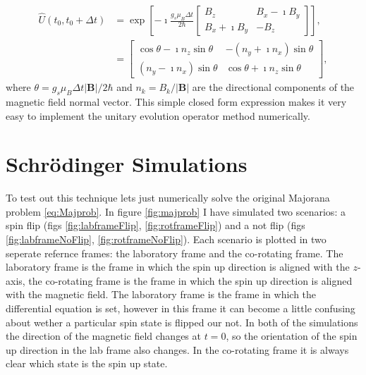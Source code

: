 \begin{align}
    \widehat{U}(t_0,t_0+\Delta t) &= \exp\left[  -\imath\frac{g_s\mu_B\Delta t}{2 \hbar} \begin{bmatrix} B_z & B_x - \imath B_y \\
                                                      B_x + \imath B_y & -B_z \end{bmatrix} \right],\\
                &= \begin{bmatrix} \cos\theta - \imath n_z \sin\theta & -\left(n_y+\imath n_x\right)\sin\theta \\
                                   \left(n_y-\imath n_x\right)\sin\theta & \cos\theta + \imath n_z \sin\theta\end{bmatrix}, 
\end{align}
where $\theta = g_s \mu_B \Delta t \vert \mathbf{B} \vert / 2\hbar$ and $n_k = B_k / \vert \mathbf{B} \vert$ are the directional components of the magnetic field normal vector.
This simple closed form expression makes it very easy to implement the unitary evolution operator method numerically.


\section{Schr\"odinger Simulations}

To test out this technique lets just numerically solve the original Majorana problem \eqref{eq:Majprob}.
In figure \ref{fig:majprob} I have simulated two scenarios: a spin flip (figs \ref{fig:labframeFlip}, \ref{fig:rotframeFlip}) and a not flip (figs \ref{fig:labframeNoFlip}, \ref{fig:rotframeNoFlip}).
Each scenario is plotted in two seperate refernce frames: the laboratory frame and the co-rotating frame.
The laboratory frame is the frame in which the spin up direction is aligned with the $z$-axis, the co-rotating frame is the frame in which the spin up direction is aligned with the magnetic field.
The laboratory frame is the frame in which the differential equation is set, however in this frame it can become a little confusing about wether a particular spin state is flipped our not.
In both of the simulations the direction of the magnetic field changes at $t=0$, so the orientation of the spin up direction in the lab frame also changes.
In the co-rotating frame it is always clear which state is the spin up state.

